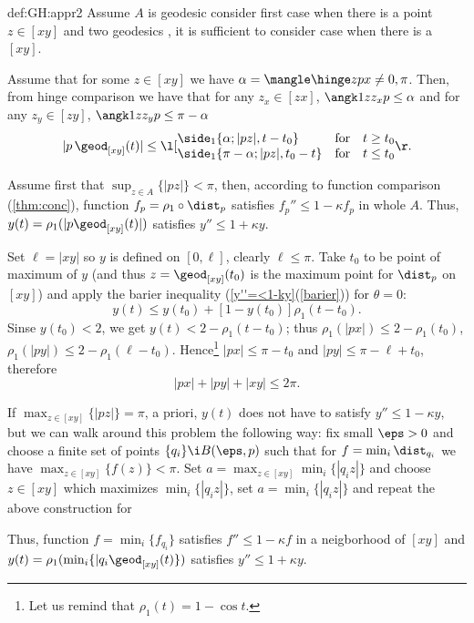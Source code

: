 {\begin{subthm}{def:GH:appr2}
Assume $A$ is geodesic consider first case when there is a point $z\in [x y]$ and two geodesics , it is sufficient to consider case when there is a $[xy]$.

Assume that for some $z\in[xy]$ we have $\alpha=\mangle\hinge z p x\not=0,\pi$.
Then, from hinge comparison we have that for any $z_x\in[zx]$,
$\angk1z{z_x}p\le\alpha$ and for any $z_y\in[zy]$,
$\angk1z{z_y}p\le\pi-\alpha$
$$|p\,\geod_{[xy]}(t)|\le 
\l[\begin{matrix}
\side_1\{\alpha;|pz|,t-t_0\}\ \ \ \ \ \,&\text{for}&t\ge t_0\\
\side_1\{\pi-\alpha;|pz|,t_0-t\}&\text{for}&t\le t_0
\end{matrix}\r.
$$








Assume first that $\sup_{z\in A}\{|pz|\}<\pi$, then, according to function comparison (\ref{thm:conc}), function $f_p=\rho_1\circ\dist_p$ satisfies $f_p''\le 1-\kappa f_p$ in whole $A$.
Thus, $y(t)=\rho_1(|p\geod_{[xy]}(t)|)$ 
satisfies $y''\le 1+\kappa y$.

Set $\ell=|xy|$ so $y$ is defined on $[0,\ell]$, clearly $\ell\le\pi$.
Take $t_0$ to be point of maximum of $y$ (and thus $z=\geod_{[xy]}(t_0)$ is the maximum point for $\dist_p$ on $[x y]$) and apply the barier inequality (\ref{y''=<1-ky}(\ref{barier})) for $\theta=0$:
$$y(t)
\le y(t_0)+[1-y(t_0)]\rho_1(t-t_0).$$
Sinse $y(t_0)< 2$, we get 
$y(t)<2-\rho_1(t-t_0)$; thus
$\rho_1(|px|)\le 2-\rho_1(t_0)$, $\rho_1(|py|)\le 2-\rho_1(\ell-t_0)$.
Hence\footnote{Let us remind that $\rho_1(t)=1-\cos t$.} $|px|\le \pi-t_0$ and $|py|\le \pi-\ell+t_0$, therefore 
$$|px|+|py|+|xy|\le 2\pi.$$








If $\max_{z\in [x y]}\{|pz|\}=\pi$, a priori, $y(t)$ does not have to satisfy $y''\le 1-\kappa y$, but we can walk around this problem the following way: fix small $\eps>0$ and choose a finite set of points $\{q_i\}\i B(\eps,p)$ such that for $f=\min_i\dist_{q_i}$ we have $\max_{z\in [x y]}\{f(z)\}<\pi$.
Set $a=\max_{z\in[x y]}\min_i\{|q_iz|\}$ and choose $z\in [x y]$ which maximizes $\min_i\{|q_iz|\}$, set $a=\min_i\{|q_iz|\}$ and repeat the above construction for 

Thus, function $f=\min_i\{f_{q_i}\}$ satisfies 
$f''\le 1 -\kappa f$ in a neigborhood of $[xy]$ and $y(t)=\rho_1(\min_i\{|q_i\geod_{[xy]}(t)\})$ 
satisfies $y''\le 1+\kappa y$.


\end{subthm}}
